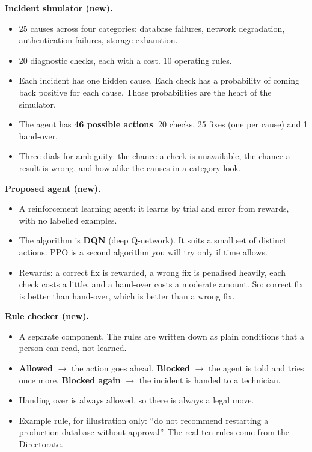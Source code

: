 \documentclass[10pt,a4paper]{article}
\begin{document}
\textbf{Incident simulator (new).}
\begin{itemize}
  \item 25 causes across four categories: database failures, network degradation, authentication failures, storage exhaustion.
  \item 20 diagnostic checks, each with a cost. 10 operating rules.
  \item Each incident has one hidden cause. Each check has a probability of coming back positive for each cause. Those probabilities are the heart of the simulator.
  \item The agent has \textbf{46 possible actions}: 20 checks, 25 fixes (one per cause) and 1 hand-over.
  \item Three dials for ambiguity: the chance a check is unavailable, the chance a result is wrong, and how alike the causes in a category look.
\end{itemize}

\textbf{Proposed agent (new).}
\begin{itemize}
  \item A reinforcement learning agent: it learns by trial and error from rewards, with no labelled examples.
  \item The algorithm is \textbf{DQN} (deep Q-network). It suits a small set of distinct actions. PPO is a second algorithm you will try only if time allows.
  \item Rewards: a correct fix is rewarded, a wrong fix is penalised heavily, each check costs a little, and a hand-over costs a moderate amount. So: correct fix is better than hand-over, which is better than a wrong fix.
\end{itemize}

\textbf{Rule checker (new).}
\begin{itemize}
  \item A separate component. The rules are written down as plain conditions that a person can read, not learned.
  \item \textbf{Allowed} \(\rightarrow\) the action goes ahead. \textbf{Blocked} \(\rightarrow\) the agent is told and tries once more. \textbf{Blocked again} \(\rightarrow\) the incident is handed to a technician.
  \item Handing over is always allowed, so there is always a legal move.
  \item Example rule, for illustration only: ``do not recommend restarting a production database without approval''. The real ten rules come from the Directorate.
\end{itemize}
\end{document}
